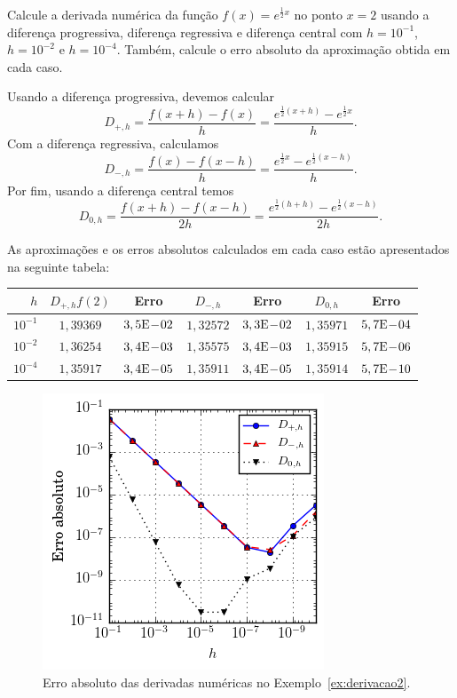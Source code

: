 \begin{ex}\label{ex:derivacao2}
Calcule a derivada numérica da função $f(x)=e^{\frac{1}{2}x}$ no ponto $x=2$ usando a diferença progressiva, diferença regressiva e diferença central com $h=10^{-1}$, $h=10^{-2}$ e $h=10^{-4}$. Também, calcule o erro absoluto da aproximação obtida em cada caso.
\end{ex}
\begin{sol}
  Usando a diferença progressiva, devemos calcular
  \begin{equation*}
    D_{+,h} = \frac{f(x+h) - f(x)}{h} = \frac{e^{\frac{1}{2}(x+h)} - e^{\frac{1}{2}x}}{h}.
  \end{equation*}
  Com a diferença regressiva, calculamos
  \begin{equation*}
    D_{-,h} = \frac{f(x) - f(x-h)}{h} = \frac{e^{\frac{1}{2}x} - e^{\frac{1}{2}(x-h)}}{h}.
  \end{equation*}
  Por fim, usando a diferença central temos
  \begin{equation*}
    D_{0,h} = \frac{f(x+h) - f(x-h)}{2h} = \frac{e^{\frac{1}{2}(h+h)} - e^{\frac{1}{2}(x-h)}}{2h}.
  \end{equation*}

  As aproximações e os erros absolutos calculados em cada caso estão apresentados na seguinte tabela:
  \begin{center}
    \begin{tabular}{r|cc|cc|cc}
      $h$  & $D_{+,h}f(2)$ & Erro & $D_{-,h}$ & Erro & $D_{0,h}$ & Erro \\\hline
      $10^{-1}$ & $1,39369$ & $3,5\mathrm{E}\!-\!02$   & $1,32572$ & $3,3\mathrm{E}\!-\!02$ & $1,35971$ & $5,7\mathrm{E}\!-\!04$\\
      $10^{-2}$ & $1,36254$ & $3,4\mathrm{E}\!-\!03$   & $1,35575$ & $3,4\mathrm{E}\!-\!03$ & $1,35915$ & $5,7\mathrm{E}\!-\!06$\\
      $10^{-4}$ & $1,35917$ & $3,4\mathrm{E}\!-\!05$   & $1,35911$ & $3,4\mathrm{E}\!-\!05$ & $1,35914$ & $5,7\mathrm{E}\!-\!10$\\\hline
    \end{tabular}
  \end{center}
\end{sol}

\begin{figure}
  \centering
  \includegraphics{./cap_derivacao/pics/ex_derivacao2/ex_derivacao2}
  \caption{Erro absoluto das derivadas numéricas no Exemplo~\ref{ex:derivacao2}.}
  \label{fig:ex_derivacao2}
\end{figure}


